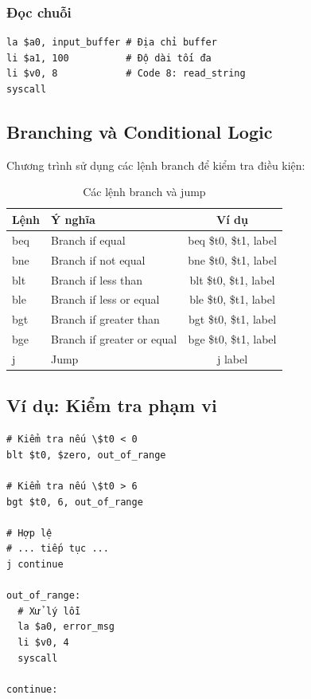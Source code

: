 \subsubsection{Đọc chuỗi}

\begin{verbatim}
la $a0, input_buffer # Địa chỉ buffer
li $a1, 100          # Độ dài tối đa
li $v0, 8            # Code 8: read_string
syscall
\end{verbatim}

\subsection{Branching và Conditional Logic}

Chương trình sử dụng các lệnh branch để kiểm tra điều kiện:

\begin{table}[H]
\centering
\begin{tabular}{|l|l|c|}
\hline
\textbf{Lệnh} & \textbf{Ý nghĩa} & \textbf{Ví dụ} \\
\hline
beq & Branch if equal & beq \$t0, \$t1, label \\
\hline
bne & Branch if not equal & bne \$t0, \$t1, label \\
\hline
blt & Branch if less than & blt \$t0, \$t1, label \\
\hline
ble & Branch if less or equal & ble \$t0, \$t1, label \\
\hline
bgt & Branch if greater than & bgt \$t0, \$t1, label \\
\hline
bge & Branch if greater or equal & bge \$t0, \$t1, label \\
\hline
j & Jump & j label \\
\hline
\end{tabular}
\caption{Các lệnh branch và jump}
\end{table}

\subsection{Ví dụ: Kiểm tra phạm vi}

\begin{verbatim}
# Kiểm tra nếu \$t0 < 0
blt $t0, $zero, out_of_range

# Kiểm tra nếu \$t0 > 6
bgt $t0, 6, out_of_range

# Hợp lệ
# ... tiếp tục ...
j continue

out_of_range:
  # Xử lý lỗi
  la $a0, error_msg
  li $v0, 4
  syscall

continue:
\end{verbatim}

